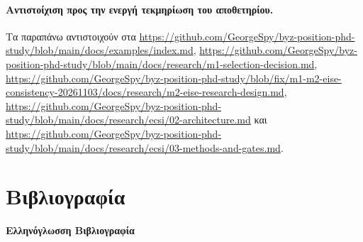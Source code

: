 \documentclass[11pt,a4paper]{article}
\begin{document}
\paragraph{Αντιστοίχιση προς την ενεργή τεκμηρίωση του αποθετηρίου.}
Τα παραπάνω αντιστοιχούν στα \url{https://github.com/GeorgeSpy/byz-position-phd-study/blob/main/docs/examples/index.md},
\url{https://github.com/GeorgeSpy/byz-position-phd-study/blob/main/docs/research/m1-selection-decision.md},
\url{https://github.com/GeorgeSpy/byz-position-phd-study/blob/fix/m1-m2-eise-consistency-20261103/docs/research/m2-eise-research-design.md},
\url{https://github.com/GeorgeSpy/byz-position-phd-study/blob/main/docs/research/ecsi/02-architecture.md}
και \url{https://github.com/GeorgeSpy/byz-position-phd-study/blob/main/docs/research/ecsi/03-methods-and-gates.md}.
\clearpage

\section*{Βιβλιογραφία}
\sloppy

\textbf{Ελληνόγλωσση Βιβλιογραφία}
\end{document}
